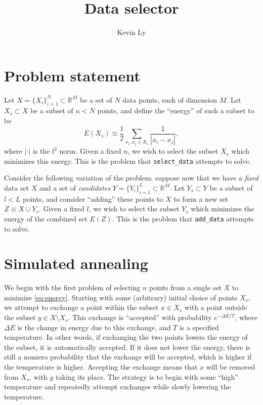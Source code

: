 \documentclass{article}
\title{Data selector}
\author{Kevin Ly}
\begin{document}
\maketitle

\section{Problem statement}

Let $X = \{ X_i \}_{i = 1}^{N} \subset \mathbb{R}^M$ be a set of $N$ data points, each of dimension $M$.
Let $X_s \subset X$ be a subset of $n < N$ points, and define the ``energy'' of such a subset to be
\begin{equation}
    \label{eq:energy}
    E(X_s) \equiv \frac{1}{2}\sum_{x_i, x_j \in X_s} \frac{1}{|x_i - x_j|},
\end{equation}
where $| \cdot |$ is the $l^2$ norm.
Given a fixed $n$, we wish to select the subset $X_s$ which minimizes this energy.
This is the problem that \texttt{select\_data} attempts to solve.

Consider the following variation of the problem: suppose now that we have a \emph{fixed} data set $X$ and a set of \emph{candidates} $Y = \{ Y_i \}_{i = 1}^{L} \subset \mathbb{R}^M$.
Let $Y_s \subset Y$ be a subset of $l < L$ points, and consider ``adding'' these points to $X$ to form a new set $Z \equiv X \cup Y_s$.
Given a fixed $l$, we wish to select the subset $Y_s$ which minimizes the energy of the combined set $E(Z)$.
This is the problem that \texttt{add\_data} attempts to solve.

\section{Simulated annealing}

We begin with the first problem of selecting $n$ points from a single set $X$ to minimize \eqref{eq:energy}.
Starting with some (arbitrary) initial choice of points $X_{s}$, we attempt to exchange a point within the subset $x \in X_{s}$ with a point outside the subset $y \in X \setminus X_s$.
This exchange is ``accepted'' with probability $e^{-\Delta E / T}$, where $\Delta E$ is the change in energy due to this exchange, and $T$ is a specified temperature.
In other words, if exchanging the two points lowers the energy of the subset, it is automatically accepted.
If it does not lower the energy, there is still a nonzero probability that the exchange will be accepted, which is higher if the temperature is higher.
Accepting the exchange means that $x$ will be removed from $X_s$, with $y$ taking its place.
The strategy is to begin with some ``high'' temperature and repeatedly attempt exchanges while slowly lowering the temperature.
\end{document}
